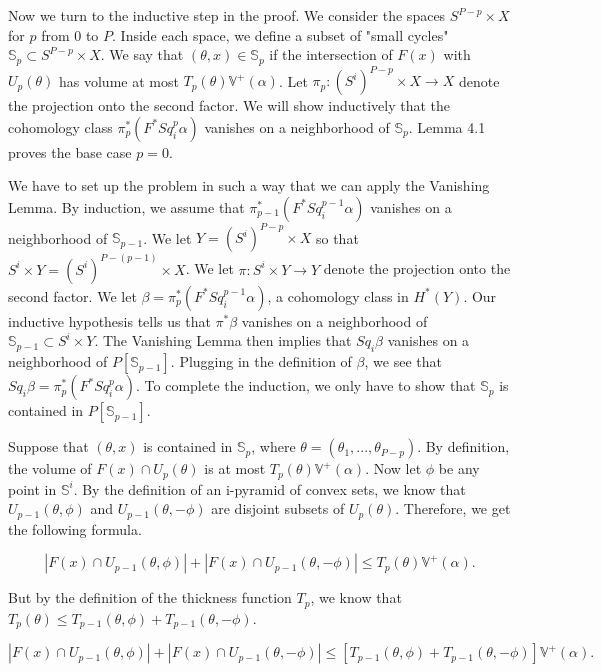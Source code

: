 \documentclass{amsart}
\newtheorem*{Theorem 1}{Theorem 1}
\newtheorem*{Theorem 2}{Theorem 2}
\newtheorem*{Theorem 1A}{Theorem 1A}
\newtheorem*{Theorem 2A}{Theorem 2A}
\newtheorem*{vanishing lemma}{Vanishing Lemma}
\numberwithin{equation}{section}
\begin{document}
Now we turn to the inductive step in the proof.  We consider
the spaces $S^{P-p} \times X$ for $p$ from $0$ to $P$.  Inside
each space, we define a subset of "small cycles" $\mathbb{S}_p
\subset S^{P-p} \times X$.  We say that $(\theta, x) \in
\mathbb{S}_p$ if the intersection of $F(x)$ with
$U_p(\theta)$ has volume at most $T_p(\theta) \mathbb{V}^+(\alpha)$.
Let $\pi_p: (S^i)^{P-p} \times X \rightarrow X$ denote the
projection onto the second factor.  We will show inductively
that the cohomology class $\pi_p^* (F^* Sq_i^p \alpha)$ vanishes
on a neighborhood of $\mathbb{S}_p$.  Lemma 4.1 proves
the base case $p = 0$.

We have to set up the problem in such a way that we can apply 
the Vanishing Lemma.  By induction, we assume that $\pi_{p-1}^*
(F^* Sq_i^{p-1} \alpha)$ vanishes on a neighborhood of 
$\mathbb{S}_{p-1}$.  We let $Y = (S^i)^{P-p} \times X$ so
that $S^i \times Y = (S^i)^{P-(p-1)} \times X$.  We let $\pi:
S^i \times Y \rightarrow Y$ denote the projection onto
the second factor.  We let $\beta = \pi_p^* (F^* Sq_i^{p-1} \alpha)$,
a cohomology class in $H^*(Y)$.  Our inductive hypothesis
tells us that $\pi^*\beta$ vanishes on a neighborhood of
$\mathbb{S}_{p-1} \subset S^i \times Y$.  The Vanishing Lemma
then implies that $Sq_i \beta$ vanishes on a neighborhood
of $P[\mathbb{S}_{p-1}]$.  Plugging in the definition of $\beta$,
we see that $Sq_i \beta = \pi_p^*(F^* Sq_i^p \alpha)$.  To
complete the induction, we only have to show that $\mathbb{S}_p$
is contained in $P[\mathbb{S}_{p-1}]$.

Suppose that $(\theta, x)$ is contained in $\mathbb{S}_p$,
where $\theta = (\theta_1, ..., \theta_{P-p})$.  By definition,
the volume of $F(x) \cap U_p(\theta)$ is at most 
$T_p(\theta) \mathbb{V}^+(\alpha)$.  Now let $\phi$ be any
point in $\mathbb{S}^i$.  By the definition of an i-pyramid
of convex sets, we know that $U_{p-1}(\theta, \phi)$ and
$U_{p-1}(\theta, - \phi)$ are disjoint subsets of $U_p(\theta)$.
Therefore, we get the following formula.

$$|F(x) \cap U_{p-1}(\theta, \phi)| + |F(x) \cap U_{p-1}(\theta, - \phi)|
\le T_p(\theta) \mathbb{V}^+(\alpha).$$

But by the definition of the thickness function $T_p$, we know that
$T_p(\theta) \le T_{p-1}(\theta, \phi) + T_{p-1}(\theta, -\phi)$.  

$$ |F(x) \cap U_{p-1}(\theta, \phi)| + |F(x) \cap U_{p-1}(\theta, - \phi)|
\le [T_{p-1}(\theta, \phi) + T_{p-1}(\theta, - \phi)] \mathbb{V}^+(\alpha).$$
\end{document}
